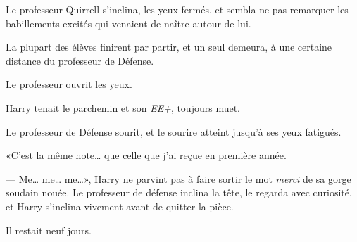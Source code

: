 Le professeur Quirrell s'inclina, les yeux fermés, et sembla ne pas remarquer les babillements excités qui venaient de naître autour de lui.

La plupart des élèves finirent par partir, et un seul demeura, à une certaine distance du professeur de Défense.

Le professeur ouvrit les yeux.

Harry tenait le parchemin et son \emph{EE+}, toujours muet.

Le professeur de Défense sourit, et le sourire atteint jusqu'à ses yeux fatigués.

«C'est la même note… que celle que j'ai reçue en première année.

--- Me… me… me…», Harry ne parvint pas à faire sortir le mot \emph{merci} de sa gorge soudain nouée. Le professeur de défense inclina la tête, le regarda avec curiosité, et Harry s'inclina vivement avant de quitter la pièce.

Il restait neuf jours.
